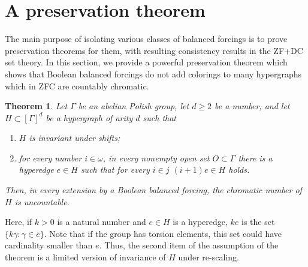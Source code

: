 \documentclass{article}
\newcommand{\gw}{\omega}
\newtheorem{theorem}{Theorem}[section]
\theoremstyle{definition}
\begin{document}
\section{A preservation theorem}
\label{preservationsection}

The main purpose of isolating various classes of balanced forcings is to prove preservation theorems for them, with resulting consistency results in the ZF+DC set theory. In this section, we provide a powerful preservation theorem which shows that Boolean balanced forcings do not add colorings to many hypergraphs which in ZFC are countably chromatic.


\begin{theorem}
	\label{preservationtheorem}
	Let $\Gamma$ be an abelian Polish group, let $d\geq 2$ be a number, and let $H\subset[\Gamma]^d$ be a hypergraph of arity $d$ such that
	
	\begin{enumerate}
		\item $H$ is invariant under shifts;
		\item for every number $i\in\gw$, in every nonempty open set $O\subset\Gamma$ there is a hyperedge $e\in H$ such that for every $i\in j$ $(i+1)e\in H$ holds.
	\end{enumerate}
	
\noindent Then, in every extension by a Boolean balanced forcing, the chromatic number of $H$ is uncountable.
\end{theorem}

\noindent Here, if $k>0$ is a natural number and $e\in H$ is a hyperedge, $ke$ is the set $\{k\gamma\colon \gamma\in e\}$. Note that if the group has torsion elements, this set could have cardinality smaller than $e$. Thus, the second item of the assumption of the theorem is a limited version of invariance of $H$ under re-scaling.
\end{document}
